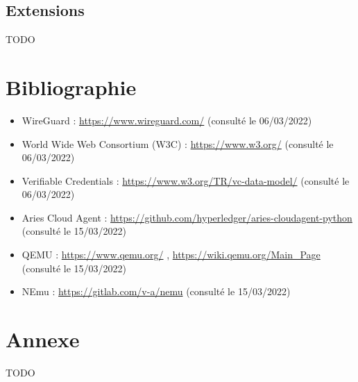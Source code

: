 \documentclass[12pt, openany]{report}
\begin{document}
\subsection{Extensions}
\noindent 
\begin{flushleft}
TODO
\end{flushleft}

\section{Bibliographie}
\noindent 
\begin{itemize}

\item WireGuard : \url{https://www.wireguard.com/} (consulté le 06/03/2022) 
\item World Wide Web Consortium (W3C) : \url{https://www.w3.org/} (consulté le 06/03/2022)
\item Verifiable Credentials : \url{https://www.w3.org/TR/vc-data-model/} (consulté le 06/03/2022) 
\item Aries Cloud Agent : \url{https://github.com/hyperledger/aries-cloudagent-python} (consulté le 15/03/2022)
\item QEMU : \url{https://www.qemu.org/} , \url{https://wiki.qemu.org/Main_Page} (consulté le 15/03/2022)
\item NEmu : \url{https://gitlab.com/v-a/nemu} (consulté le 15/03/2022)

\end{itemize}

\section{Annexe}
\noindent 
\begin{flushleft}
TODO
\end{flushleft}
\end{document}
